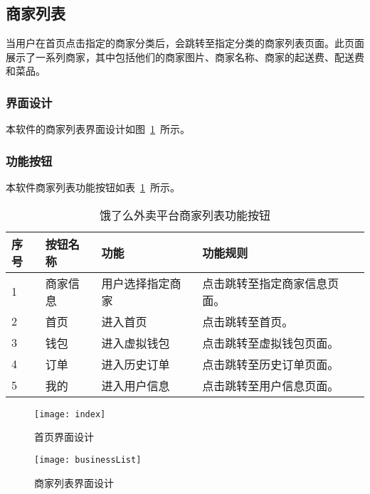 \subsection{商家列表}
当用户在首页点击指定的商家分类后，会跳转至指定分类的商家列表页面。此页面展示了一系列商家，其中包括他们的商家图片、商家名称、商家的起送费、配送费和菜品。
\subsubsection{界面设计}
本软件的商家列表界面设计如图~\ref{fig:businessList}~所示。
\subsubsection{功能按钮}
本软件商家列表功能按钮如表~\ref{tab:table3}~所示。
\begin{table}[htbp]
    \caption{饿了么外卖平台商家列表功能按钮}\label{tab:table3}
    \vspace{0.5em}\wuhao
    \begin{tabularx}{\textwidth}{lllX}
    \toprule[1.5pt]
    序号 & 按钮名称 & 功能 & 功能规则 \\ 
    \midrule[1pt]
    1 & 商家信息 & 用户选择指定商家 & 点击跳转至指定商家信息页面。 \\
    2 & 首页 & 进入首页 & 点击跳转至首页。 \\
    3 & 钱包 & 进入虚拟钱包 & 点击跳转至虚拟钱包页面。 \\
    4 & 订单 & 进入历史订单 & 点击跳转至历史订单页面。 \\
    5 & 我的 & 进入用户信息 & 点击跳转至用户信息页面。 \\
\bottomrule[1.5pt]
\end{tabularx}
\vspace{\baselineskip}
\end{table}
\begin{figure}[htbp]
    \centering
    \begin{minipage}{0.4\textwidth}
    \centering
    \texttt{[image: index]}
    \caption{首页界面设计}\label{fig:index}
    \end{minipage}
    \begin{minipage}{0.4\textwidth}
    \centering
    \texttt{[image: businessList]}
    \caption{商家列表界面设计}\label{fig:businessList}
    \end{minipage}
    \vspace{\baselineskip}
\end{figure}

